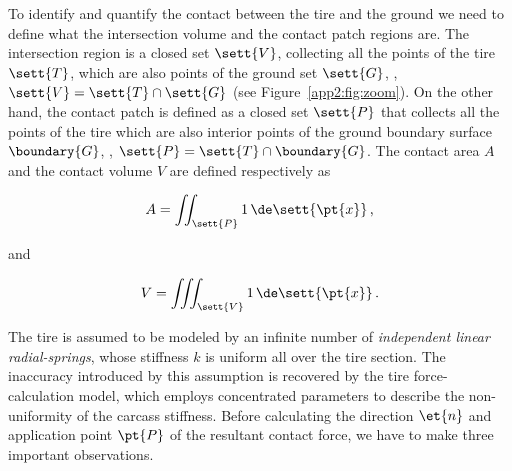 To identify and quantify the contact between the tire and the ground we need to define what the intersection volume and the contact patch regions are. The intersection region is a closed set $\sett{V}$, collecting all the points of the tire $\sett{T}$, which are also points of the ground set $\sett{G}$, \ie{}, $\sett{V} = \sett{T} \cap \sett{G}$ (see Figure~\ref{app2:fig:zoom}). On the other hand, the contact patch is defined as a closed set $\sett{P}$ that collects all the points of the tire which are also interior points of the ground boundary surface $\boundary{G}$, \ie{}, $\sett{P} = \sett{T} \cap \boundary{G}$. The contact area $A$ and the contact volume $V$ are defined respectively as
%
\begin{center}
  \begin{minipage}[b]{0.425\textwidth}
    \vspace{-\baselineskip}
    \begin{equation}
      A = \iint_\sett{P} 1 \, \de\sett{\pt{x}}  \, \text{,}
      \label{app2:eq:int_area}
    \end{equation}
  \end{minipage}%
  \hfill\hfill and \hfill
  \begin{minipage}[b]{0.425\textwidth}
    \vspace{-\baselineskip}
    \begin{equation}
      V = \iiint_\sett{V} 1 \, \de\sett{\pt{x}} \, \text{.}
      \label{app2:eq:int_volume}
    \end{equation}
  \end{minipage}
\end{center}

The tire is assumed to be modeled by an infinite number of \emph{independent linear radial-springs}, whose stiffness $k$ is uniform all over the tire section. The inaccuracy introduced by this assumption is recovered by the tire force-calculation model, which employs concentrated parameters to describe the non-uniformity of the carcass stiffness. Before calculating the direction $\et{n}$ and application point $\pt{P}$ of the resultant contact force, we have to make three important observations.

